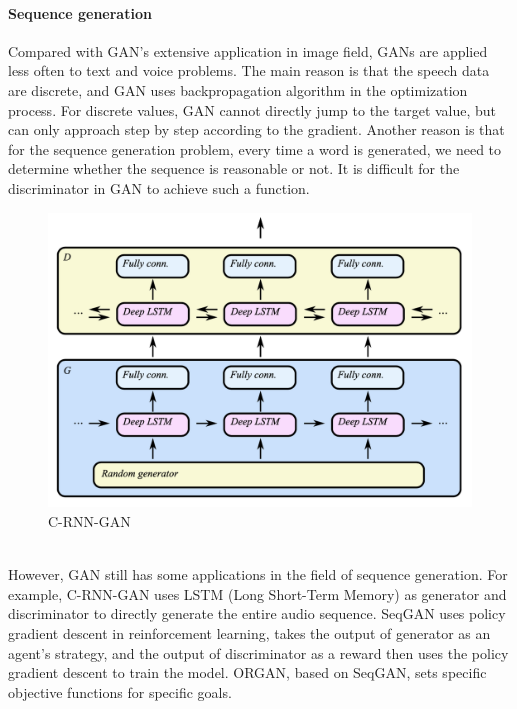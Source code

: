 \documentclass[11pt,a4paper]{article}
\begin{document}
\paragraph{Sequence generation}
Compared with GAN's extensive application in image field, GANs are applied less often to text and voice problems. The main reason is that the speech data are discrete, and GAN uses backpropagation algorithm in the optimization process. For discrete values, GAN cannot directly jump to the target value, but can only approach step by step according to the gradient\citep{rocca_rocca_2019}. Another reason is that for the sequence generation problem, every time a word is generated, we need to determine whether the sequence is reasonable or not. It is difficult for the discriminator in GAN to achieve such a function.
\\
\begin{figure}[ht!]
\centering
\includegraphics[scale=0.5]{2.png}
\caption{C-RNN-GAN\citep{mogren2016c}}
\label{fig:C-RNN-GAN}
\end{figure}
\\
\newline
However, GAN still has some applications in the field of sequence generation. For example, C-RNN-GAN\citep{mogren2016c} uses LSTM (Long Short-Term Memory) as generator and discriminator to directly generate the entire audio sequence. SeqGAN\citep{yu2017seqgan} uses policy gradient descent in reinforcement learning, takes the output of generator as an agent's strategy, and the output of discriminator as a reward then uses the policy gradient descent to train the model. ORGAN\citep{guimaraes2017objective}, based on SeqGAN, sets specific objective functions for specific goals.
\end{document}
